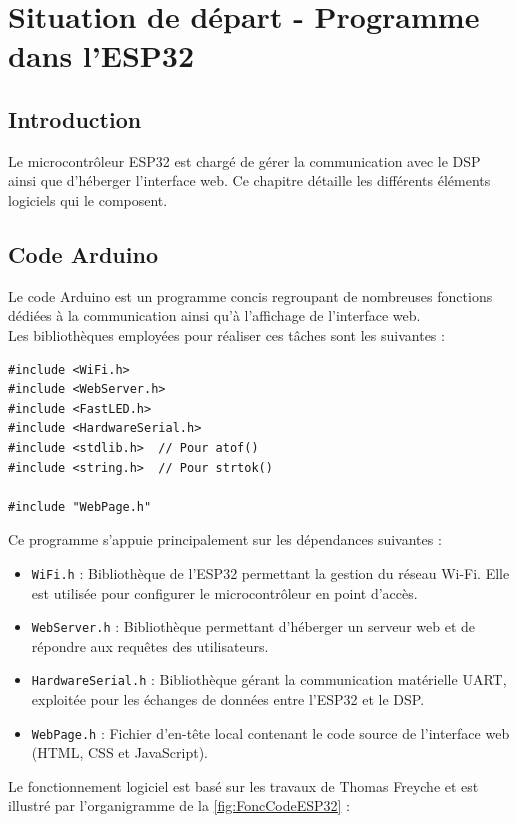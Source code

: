 \chapter{Situation de départ - Programme dans l'ESP32}
\label{sec:CodeESP32}

\section{Introduction}
Le microcontrôleur ESP32 est chargé de gérer la communication avec le DSP ainsi que d'héberger l'interface web. Ce chapitre détaille les différents éléments logiciels qui le composent.

\section{Code Arduino}
Le code Arduino est un programme concis regroupant de nombreuses fonctions dédiées à la communication ainsi qu'à l'affichage de l'interface web.\\

Les bibliothèques employées pour réaliser ces tâches sont les suivantes :

\begin{verbatim}
#include <WiFi.h>
#include <WebServer.h>
#include <FastLED.h>
#include <HardwareSerial.h>
#include <stdlib.h>  // Pour atof()
#include <string.h>  // Pour strtok()

#include "WebPage.h"
\end{verbatim}

Ce programme s'appuie principalement sur les dépendances suivantes :

\begin{itemize}
  \item \texttt{WiFi.h} : Bibliothèque de l'ESP32 permettant la gestion du réseau Wi-Fi. Elle est utilisée pour configurer le microcontrôleur en point d'accès.
  \item \texttt{WebServer.h} : Bibliothèque permettant d'héberger un serveur web et de répondre aux requêtes des utilisateurs.
  \item \texttt{HardwareSerial.h} : Bibliothèque gérant la communication matérielle UART, exploitée pour les échanges de données entre l'ESP32 et le DSP.
  \item \texttt{WebPage.h} : Fichier d'en-tête local contenant le code source de l'interface web (HTML, CSS et JavaScript).
\end{itemize}

Le fonctionnement logiciel est basé sur les travaux de Thomas Freyche et est illustré par l'organigramme de la \autoref{fig:FoncCodeESP32} :

